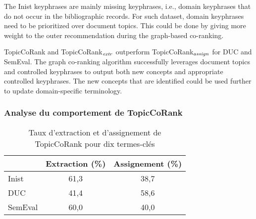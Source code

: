         The Inist keyphrases are mainly missing keyphrases, i.e., domain keyphrases that do not occur in the bibliographic records. 
        For such dataset, domain keyphrases need to be prioritized over document topics. This could be done by giving more weight to the outer recommendation during the graph-based co-ranking.
        
        TopicCoRank and TopicCoRank$_\textnormal{\textit{extr}}$ outperform TopicCoRank$_\textnormal{\textit{assign}}$ for DUC and SemEval.
        The graph co-ranking algorithm successfully leverages document topics and
        controlled keyphrases to output both new concepts and appropriate controlled keyphrases.
        The new concepts that are identified could be used further to update domain-specific terminology.
      
      \subsubsection{Analyse du comportement de TopicCoRank}
      \label{subsubsec:main-automatic_keyphrase_annotation-supervised_automatic_keyphrase_annotation-evaluation-topiccorank-analysis}

        \begin{table}[!h]
          \centering
          \begin{tabular}{l|cc}
              \toprule
              & Extraction (\%) & Assignement (\%)\\
              \hline
              Inist & 61,3 & 38,7\\
              DUC & 41,4 & 58,6\\
              SemEval & 60,0 & 40,0\\
              \bottomrule
          \end{tabular}
          \caption{Taux d'extraction et d'assignement de TopicCoRank pour dix
                   termes-clés
                   \label{tab:assignment_ratio}}
        \end{table}
        
